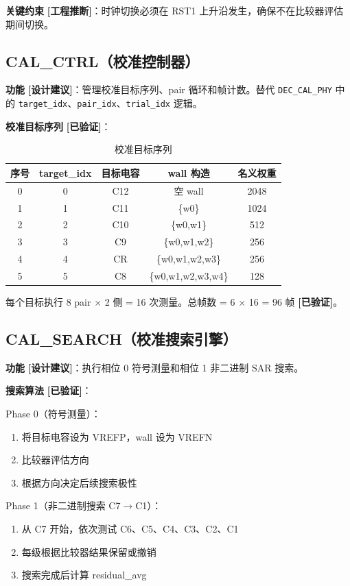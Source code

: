 \documentclass[UTF8,a4paper,11pt]{ctexart}
\newcommand{\verified}{\textcolor{verifiedgreen}{\textbf{[已验证]}}}
\newcommand{\inferred}{\textcolor{inferorange}{\textbf{[工程推断]}}}
\newcommand{\suggested}{\textcolor{suggestblue}{\textbf{[设计建议]}}}
\begin{document}
\textbf{关键约束} \inferred：时钟切换必须在 RST1 上升沿发生，确保不在比较器评估期间切换。

\subsection{CAL\_CTRL（校准控制器）}

\textbf{功能} \suggested：管理校准目标序列、pair 循环和帧计数。替代 \texttt{DEC\_CAL\_PHY} 中的 \texttt{target\_idx}、\texttt{pair\_idx}、\texttt{trial\_idx} 逻辑。

\textbf{校准目标序列} \verified：

\begin{table}[H]
\centering
\caption{校准目标序列}
\label{tab:cal-target-seq}
\begin{tabular}{ccccc}
\toprule
序号 & target\_idx & 目标电容 & wall 构造 & 名义权重 \\
\midrule
0 & 0 & C12 & 空 wall             & 2048 \\
1 & 1 & C11 & \{w0\}              & 1024 \\
2 & 2 & C10 & \{w0,w1\}           & 512  \\
3 & 3 & C9  & \{w0,w1,w2\}        & 256  \\
4 & 4 & CR  & \{w0,w1,w2,w3\}     & 256  \\
5 & 5 & C8  & \{w0,w1,w2,w3,w4\}  & 128  \\
\bottomrule
\end{tabular}
\end{table}

每个目标执行 8 pair $\times$ 2 侧 = 16 次测量。总帧数 = 6 $\times$ 16 = 96 帧 \verified。

\subsection{CAL\_SEARCH（校准搜索引擎）}

\textbf{功能} \suggested：执行相位 0 符号测量和相位 1 非二进制 SAR 搜索。

\textbf{搜索算法} \verified：

Phase 0（符号测量）：
\begin{enumerate}[leftmargin=2em]
\item 将目标电容设为 VREFP，wall 设为 VREFN
\item 比较器评估方向
\item 根据方向决定后续搜索极性
\end{enumerate}

Phase 1（非二进制搜索 C7$\rightarrow$C1）：
\begin{enumerate}[leftmargin=2em]
\item 从 C7 开始，依次测试 C6、C5、C4、C3、C2、C1
\item 每级根据比较器结果保留或撤销
\item 搜索完成后计算 residual\_avg
\end{enumerate}
\end{document}
